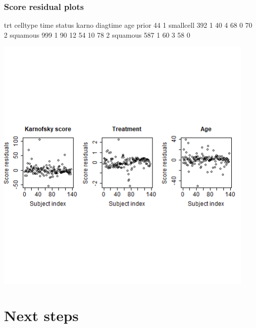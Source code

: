 \begin{frame}[fragile]
\frametitle{Score residual plots}
\begin{Rout}{-0.05}
   trt  celltype time status karno diagtime age prior
44   1 smallcell  392      1    40        4  68     0
70   2  squamous  999      1    90       12  54    10
78   2  squamous  587      1    60        3  58     0
\end{Rout}
\includegraphics[width=0.95\textwidth, clip, trim={0 5cm 0cm 5cm}]{Figures/score_residuals.png}
\end{frame}



\section[Next steps]{Next steps}
\subsection{}
\begin{frame}
\end{frame}


